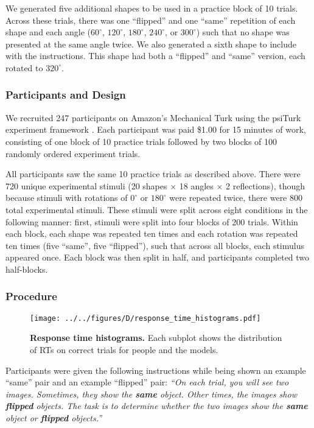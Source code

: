 \documentclass[10pt,letterpaper]{article}
\begin{document}
We generated five additional shapes to be used in a practice block of
10 trials. Across these trials, there was one ``flipped'' and one
``same'' repetition of each shape and each angle ($60^\circ$,
$120^\circ$, $180^\circ$, $240^\circ$, or $300^\circ$) such that no
shape was presented at the same angle twice. We also generated a sixth
shape to include with the instructions.  This shape had both a
``flipped'' and ``same'' version, each rotated to $320^\circ$.


\subsubsection{Participants and Design}

We recruited 247 participants on Amazon's Mechanical Turk using the
psiTurk experiment framework \cite{Mcdonnell12}. Each participant was
paid \$1.00 for 15 minutes of work, consisting of one block of 10
practice trials followed by two blocks of 100 randomly ordered
experiment trials.

All participants saw the same 10 practice trials as described
above. There were 720 unique experimental stimuli (20 shapes $\times$
18 angles $\times$ 2 reflections), though because stimuli with
rotations of $0^\circ$ or $180^\circ$ were repeated twice, there were
800 total experimental stimuli. These stimuli were split across eight
conditions in the following manner: first, stimuli were split into
four blocks of 200 trials. Within each block, each shape was repeated
ten times and each rotation was repeated ten times (five ``same'',
five ``flipped''), such that across all blocks, each stimulus appeared
once. Each block was then split in half, and participants completed
two half-blocks.

\subsubsection{Procedure}

\begin{figure*}[t]
  \begin{center}
    \texttt{[image: ../../figures/D/response\_time\_histograms.pdf]}
    \caption{\textbf{Response time histograms.} Each subplot shows the
      distribution of RTs on correct trials for people and the
      models.}
    \label{fig:histograms}
  \end{center}
\end{figure*}

Participants were given the following instructions while being shown
an example ``same'' pair and an example ``flipped'' pair: \textit{``On
  each trial, you will see two images. Sometimes, they show the
  \textbf{same} object. Other times, the images show \textbf{flipped}
  objects. The task is to determine whether the two images show the
  \textbf{same} object or \textbf{flipped} objects.''}
\end{document}
